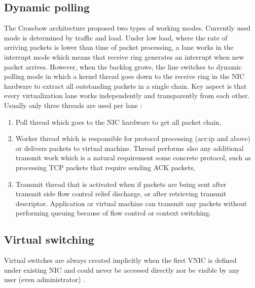 \documentclass[11pt]{book}
\begin{document}
      \subsection{Dynamic polling}	
        
        The Crossbow architecture proposed two types of working modes. Currently used mode is determined by traffic and
        load. Under low load, where the rate of arriving packets is lower than time of packet processing, a lane works in
        the interrupt mode which means that receive ring generates an interrupt when new packet arrives. However, when
        the backlog grows, the line switches to dynamic polling mode in which a kernel thread goes down to the receive
        ring in the NIC hardware to extract all outstanding packets in a single chain. Key aspect is that every
        virtualization lane works independently and transparently from each other. Usually only three threads are used
        per lane \cite{crossbow}:
        
        \begin{enumerate}
          \item Poll thread which goes to the NIC hardware to get all packet chain,
          \item Worker thread which is responsible for protocol processing (\gls{acr:ip} and above) or delivers packets to virtual
                machine. Thread performs also any additional transmit work which is a natural 
                requirement some concrete protocol, such as processing TCP packets that require sending ACK packets,
          \item Transmit thread that is activated when if packets are being sent after transmit side flow control relief
                discharge, or after retrieving transmit descriptor. Application or virtual 
                machine can transmit any packets without performing queuing because of flow control or context switching.
        \end{enumerate}


      \subsection{Virtual switching}
        
        Virtual switches are always created implicitly when the first VNIC is defined under existing NIC and could never
        be accessed directly nor be visible by any user (even administrator) \cite{crossbow2}. 
        
\end{document}
